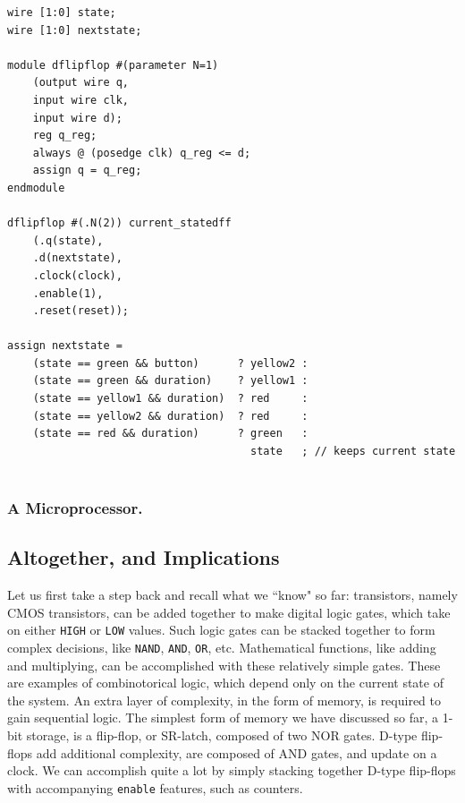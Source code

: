 \bs 
\begin{lstlisting}
wire [1:0] state; 
wire [1:0] nextstate;

module dflipflop #(parameter N=1)
    (output wire q,
    input wire clk,
    input wire d);
    reg q_reg;
    always @ (posedge clk) q_reg <= d;
    assign q = q_reg;
endmodule

dflipflop #(.N(2)) current_statedff
    (.q(state), 
    .d(nextstate), 
    .clock(clock), 
    .enable(1), 
    .reset(reset)); 

assign nextstate = 
    (state == green && button)      ? yellow2 :
    (state == green && duration)    ? yellow1 :
    (state == yellow1 && duration)  ? red     :
    (state == yellow2 && duration)  ? red     :
    (state == red && duration)      ? green   :
                                      state   ; // keeps current state
    
\end{lstlisting}
\bs



\subsubsection{A Microprocessor.}


\subsection{Altogether, and Implications}

Let us first take a step back and recall what we ``know" so far:  transistors, namely CMOS transistors, can be added together to make digital logic gates, which take on either \texttt{HIGH} or \texttt{LOW} values. Such logic gates can be stacked together to form complex decisions, like \texttt{NAND}, \texttt{AND}, \texttt{OR}, etc. Mathematical functions, like adding and multiplying, can be accomplished with these relatively simple gates. These are examples of combinotorical logic, which depend only on the current state of the system. An extra layer of complexity, in the form of memory, is required to gain sequential logic. The simplest form of memory we have discussed so far, a 1-bit storage, is a flip-flop, or SR-latch, composed of two NOR gates. D-type flip-flops add additional complexity, are composed of AND gates, and update on a clock. We can accomplish quite a lot by simply stacking together D-type flip-flops with accompanying \texttt{enable} features, such as counters.\newline

